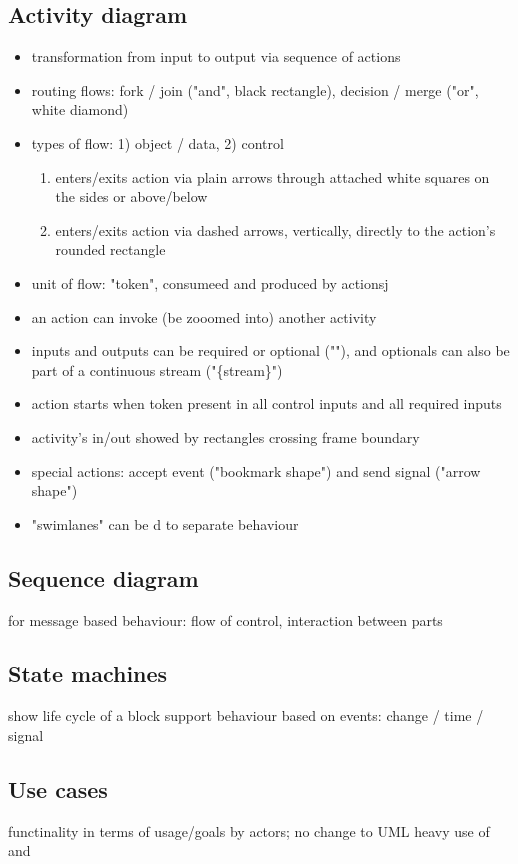 \documentclass[11pt]{article}
\begin{document}
\subsection{Activity diagram}
\label{sec:org864b37d}
\begin{itemize}
\item transformation from input to output via sequence of actions
\item routing flows: fork / join ("and", black rectangle), decision / merge ("or",
white diamond)
\item types of flow: 1) object / data, 2) control
\begin{enumerate}
\item enters/exits action via plain arrows through attached white squares on
the sides or above/below
\item enters/exits action via dashed arrows, vertically, directly to the
action's rounded rectangle
\end{enumerate}
\item unit of flow: "token", consumeed and produced by actionsj
\item an action can invoke (be zooomed into) another activity
\item inputs and outputs can be required or optional ("\label{org57d4cfc}"), and
optionals can also be part of a continuous stream ("\{stream\}")
\item action starts when token present in all control inputs and all required
inputs
\item activity's in/out showed by rectangles crossing frame boundary
\item special actions: accept event ("bookmark shape") and send signal ("arrow
shape")
\item "swimlanes" can be \label{org149fcef}d to separate behaviour
\end{itemize}
\subsection{Sequence diagram}
\label{sec:org6664622}
for message based behaviour: flow of control, interaction between parts
\subsection{State machines}
\label{sec:org75c6104}
show life cycle of a block
support behaviour based on events: change / time / signal
\subsection{Use cases}
\label{sec:org1081437}
functinality in terms of usage/goals by actors; no change to UML
heavy use of \label{orgb8fe610} and \label{orge750f93}
\end{document}
